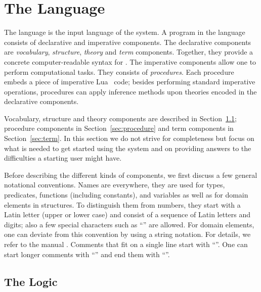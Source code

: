 





\section[<toc-entry>]{The \idp Language}
\label{sec:language}

 The \idp language is the input language of the \idp
  system. A program in the \idp language consists of declarative
  and imperative components. The declarative components are \emph{vocabulary}, \emph{structure},
  \emph{theory} and \emph{term} components. Together, they provide a concrete computer-readable syntax for \foidaggpft. The imperative components
  allow one to perform computational tasks. They consists of
  \emph{procedures}. Each procedure embeds a piece of imperative
  Lua~\cite{SPE/IerusalimschyFC96} code; besides performing standard
  imperative operations, procedures can apply inference methods upon
  \foidaggpft theories encoded in the declarative components. 





Vocabulary, structure and theory components are described in
Section~\ref{sec:logic}; procedure components in
Section~\ref{sec:procedure} and term components in
Section~\ref{sec:term}. In this section we do not strive for
completeness but focus on what is needed to get started using the
\idp system and on providing answers to the difficulties a starting
user might have.






Before describing the different kinds of components, we first discuss a
few general notational conventions. Names are everywhere, they are
used for types, predicates, functions (including constants), and
variables as well as for domain elements in structures. To distinguish
them from numbers, they start with a Latin letter (upper or lower
case) and consist of a sequence of Latin letters and digits; also a
few special characters such as ``\il{\_}'' are allowed. For domain
elements, one can deviate from this convention by using a string
notation.  For details, we refer to the manual \cite{url:idp3manual}.  Comments that fit
on a single line start with ``\il{//}''. One can start longer
comments with ``\il{/*}'' and end them with ``\il{*/}''.

\subsection{The Logic}\label{sec:logic}

